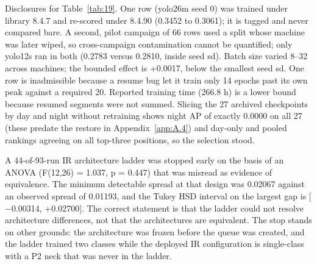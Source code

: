 \documentclass[journal,onecolumn]{IEEEtran}
\begin{document}
Disclosures for Table~\ref{tab:19}. One row (yolo26m seed 0) was trained under library 8.4.7 and re-scored under 8.4.90 (0.3452 to 0.3061); it is tagged and never compared bare. A second, pilot campaign of 66 rows used a split whose machine was later wiped, so cross-campaign contamination cannot be quantified; only yolo12s ran in both (0.2783 versus 0.2810, inside seed sd). Batch size varied 8--32 across machines; the bounded effect is +0.0017, below the smallest seed sd. One row is inadmissible because a resume bug let it train only 14 epochs past its own peak against a required 20. Reported training time (266.8 h) is a lower bound because resumed segments were not summed. Slicing the 27 archived checkpoints by day and night without retraining shows night AP of exactly 0.0000 on all 27 (these predate the restore in Appendix~\ref{app:A.4}) and day-only and pooled rankings agreeing on all top-three positions, so the selection stood.

A 44-of-93-run IR architecture ladder was stopped early on the basis of an ANOVA (F(12,26) = 1.037, p = 0.447) that was misread as evidence of equivalence. The minimum detectable spread at that design was 0.02067 against an observed spread of 0.01193, and the Tukey HSD interval on the largest gap is [$-$0.00314, +0.02700]. The correct statement is that the ladder could not resolve architecture differences, not that the architectures are equivalent. The stop stands on other grounds: the architecture was frozen before the queue was created, and the ladder trained two classes while the deployed IR configuration is single-class with a P2 neck that was never in the ladder.

\FloatBarrier
\end{document}
